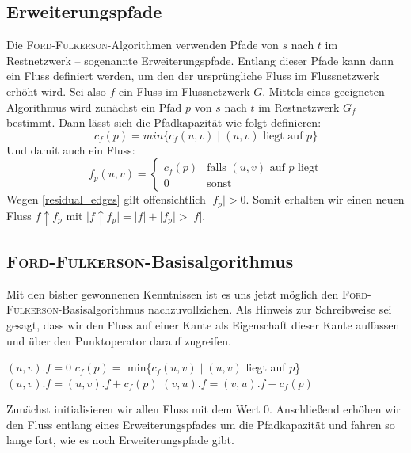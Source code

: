 \documentclass[12pt,a4paper,titlepage,onecolumn,ngerman,bibliography=totocnumbered]{scrartcl}
\theoremstyle{definition}
\theoremstyle{remark}
\newcommand{\ff}{\textsc{Ford-Fulkerson}}
\begin{document}
\subsection{Erweiterungspfade}
Die \ff -Algorithmen verwenden Pfade von $s$ nach $t$ im Restnetzwerk -- sogenannte Erweiterungspfade.
Entlang dieser Pfade kann dann ein Fluss definiert werden, um den der ursprüngliche Fluss im Flussnetzwerk erhöht wird.
\medbreak
Sei also $f$ ein Fluss im Flussnetzwerk $G$.
Mittels eines geeigneten Algorithmus wird zunächst ein Pfad $p$ von $s$ nach $t$ im Restnetzwerk $G_f$ bestimmt.
Dann lässt sich die Pfadkapazität wie folgt definieren:
\begin{equation}
    c_f(p) = min\{ c_f(u,v)\mid (u,v) \text{ liegt auf $p$}\}
\end{equation}
\medbreak
Und damit auch ein Fluss:
\begin{equation}
    f_p(u,v) = \begin{cases}c_f(p) & \text{falls $(u,v)$ auf $p$ liegt}\\0 & \text{sonst}\end{cases}
\end{equation}
\medbreak
Wegen \eqref{residual_edges} gilt offensichtlich $\lvert f_p\rvert > 0$.
Somit erhalten wir einen neuen Fluss $f\uparrow f_p$ mit $\lvert f\uparrow f_p \rvert = \lvert f \rvert + \lvert f_p\rvert > \lvert f\rvert$. %

\subsection{\ff -Basisalgorithmus}
Mit den bisher gewonnenen Kenntnissen ist es uns jetzt möglich den \ff -Basisalgorithmus nachzuvollziehen.
Als Hinweis zur Schreibweise sei gesagt, dass wir den Fluss auf einer Kante als Eigenschaft dieser Kante auffassen und über den Punktoperator darauf zugreifen.
\begin{algorithm}[H]
    \caption{\ff (G,s,t)}
    \label{alg:ff}
\begin{algorithmic}[1]
    \State $(u,v).f = 0$
\EndFor
{}
    \State $c_{f}(p) =$ min\{$c_{f}(u,v) \mid (u,v)$ liegt auf $p$\}
            \State $(u,v).f = (u,v).f + c_{f}(p)$
        \Else
            \State $(v,u).f = (v,u).f - c_{f}(p)$
        \EndIf
    \EndFor
\EndWhile
\end{algorithmic}
\end{algorithm}
Zunächst initialisieren wir allen Fluss mit dem Wert $0$.
Anschließend erhöhen wir den Fluss entlang eines Erweiterungspfades um die Pfadkapazität und fahren so lange fort, wie es noch Erweiterungspfade gibt.
\end{document}
